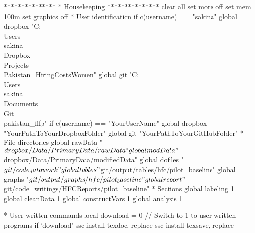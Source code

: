 {\smallskip}
***************
* Housekeeping 
***************
{\smallskip}
clear all
set more off
set mem 100m
set graphics off
{\smallskip}
{\smallskip}
* User identification
if c(username) == "sakina" {\lbr}
        global dropbox "C:\\Users\\sakina\\Dropbox\\Projects\\Pakistan_HiringCostsWomen"
        global git         "C:\\Users\\sakina\\Documents\\Git\\pakistan_flfp"
{\rbr}
{\smallskip}
if c(username) == "YourUserName" {\lbr}
        global dropbox "YourPathToYourDropboxFolder"
        global git         "YourPathToYourGitHubFolder"
{\rbr}
{\smallskip}
{\smallskip}
* File directories
global rawData          "$dropbox/Data/PrimaryData/rawData"
global modData          "$dropbox/Data/PrimaryData/modifiedData"
global dofiles          "$git/code_datawork"
global tables           "$git/output/tables/hfc/pilot_baseline"
global graphs           "$git/output/graphs/hfc/pilot_baseline"
global report           "$git/code_writings/HFCReports/pilot_baseline"
{\smallskip}
{\smallskip}
* Sections
global labeling         1
global cleanData        1
global constructVars  1
global analysis 1
{\smallskip}
        
* User-written commands
local download = 0 // Switch to 1 to user-written programs
if `download' {\lbr}
        ssc install texdoc, replace
        ssc install texsave, replace
        {\rbr}
